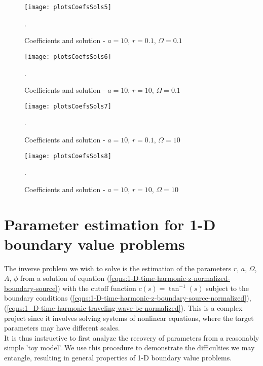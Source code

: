 \documentclass[12pt,twoside]{report}
\begin{document}
\begin{figure} 
\begin{center}
\texttt{[image: plotsCoefsSols5]}
\end{center}
\caption {Coefficients and solution - $a = 10$, $r = 0.1$, $\Omega = 0.1$}.

\label{fig:atanCoefsPlots5}
\end{figure}

\begin{figure} 
\begin{center}
\texttt{[image: plotsCoefsSols6]}
\end{center}
\caption {Coefficients and solution - $a = 10$, $r = 10$, $\Omega = 0.1$}.

\label{fig:atanCoefsPlots6}
\end{figure}

\begin{figure} 
\begin{center}
\texttt{[image: plotsCoefsSols7]}
\end{center}
\caption {Coefficients and solution - $a = 10$, $r = 0.1$, $\Omega = 10$}.

\label{fig:atanCoefsPlots7}
\end{figure}

\begin{figure} 
\begin{center}
\texttt{[image: plotsCoefsSols8]}
\end{center}
\caption {Coefficients and solution - $a = 10$, $r = 10$, $\Omega = 10$}.

\label{fig:atanCoefsPlots8}
\end{figure}



\newpage

\chapter{Parameter estimation for 1-D boundary value problems}
The inverse problem we wish to solve is the estimation of the parameters $r$, $a$, $\Omega$, $A$, $\phi$ from a solution of equation (\ref{eqns:1-D-time-harmonic-z-normalized-boundary-source}) with the cutoff function $c(s) = \tan^{-1}(s)$ subject to the boundary conditions (\ref{eqns:1-D-time-harmonic-z-boundary-source-normalized}), (\ref{eqns:1_D-time-harmonic-traveling-wave-bc-normalized}). This is a complex project since it involves solving systems of nonlinear equations, where the target parameters may have different scales.\\
It is thus instructive to first analyze the recovery of parameters from  a reasonably simple 'toy model'. We use this procedure to demonstrate the difficulties we may entangle, resulting in general properties of 1-D boundary value problems.
\end{document}
